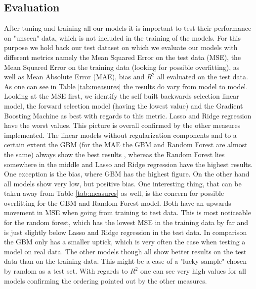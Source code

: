 \subsection{Evaluation}
After tuning and training all our models it is important to test their performance on "unseen" data, which is not included in the training of the models. For this purpose we hold back our test dataset on which we evaluate our models with different metrics namely the Mean Squared Error on the test data (MSE), the Mean Squared Error on the training data (looking for possible overfitting),  as well as  Mean Absolute Error (MAE), bias and  $R^2$ all evaluated on the test data. As one can see in Table \ref{tab:measures} the results do vary from model to model. Looking at the MSE first, we identify the self built backwards selection linear model, the forward selection model (having the lowest value) and the Gradient Boosting Machine as best with regards to this metric. Lasso and Ridge regression have the worst values. This picture is overall confirmed by the other measures implemented. The linear models without regularization components and to a certain extent the GBM (for the MAE the GBM and Random Forest are almost the same) always show the best results , whereas the Random Forest lies somewhere in the middle and Lasso and Ridge regression have the highest results. One exception is the bias, where GBM has the highest figure. On the other hand all models show very low, but positive bias. One interesting thing, that can be taken away from Table \ref{tab:measures} as well, is the concern for possible overfitting for the GBM and Random Forest model.
Both have an upwards movement in MSE when going from training to test data. This is most noticeable for the random forest, which has the lowest MSE in the training data by far and is just slightly below Lasso and Ridge regression in the test data. In comparison the GBM only has a smaller uptick, which is very often the case when testing a model on real data. The other models though all show better results on the test data than on the training data. This might be a case of a "lucky sample" chosen by random as a test set. With regards to $R^2$ one can see very high values for all models confirming the ordering pointed out by the other measures. 





